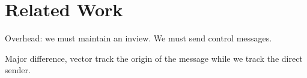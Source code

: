 
\section{Related Work}
\label{sec:relatedwork}

Overhead: we must maintain an inview. We must send control messages. 

Major difference, vector track the origin of the message while we track the
direct sender. 

